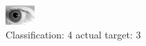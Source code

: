 \begin{figure}[h!]
\begin{center}
\includegraphics[width=0.60\columnwidth]{figures/ID225_class_4_target_3.png}
\end{center}
\caption{ Classification: 4 actual target: 3}
\label{fig:ID225_class_4_target_3}
\end{figure}
